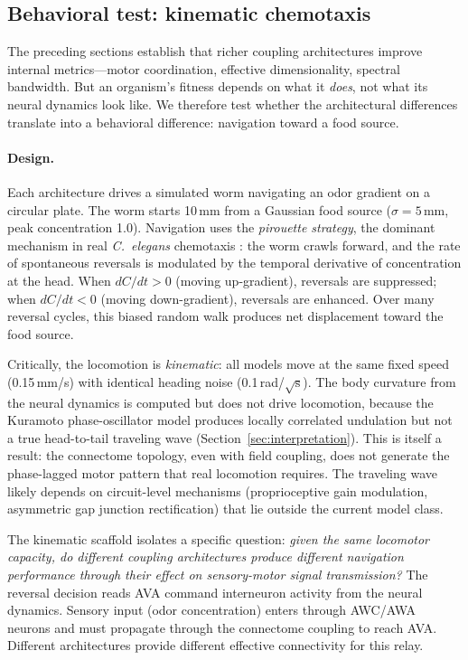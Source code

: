 \documentclass[12pt]{article}
\begin{document}
\subsection{Behavioral test: kinematic chemotaxis}
\label{sec:chemotaxis}

The preceding sections establish that richer coupling architectures improve internal metrics---motor coordination, effective dimensionality, spectral bandwidth. But an organism's fitness depends on what it \textit{does}, not what its neural dynamics look like. We therefore test whether the architectural differences translate into a behavioral difference: navigation toward a food source.

\paragraph{Design.} Each architecture drives a simulated worm navigating an odor gradient on a circular plate. The worm starts 10\,mm from a Gaussian food source ($\sigma = 5$\,mm, peak concentration 1.0). Navigation uses the \textit{pirouette strategy}, the dominant mechanism in real \textit{C.~elegans} chemotaxis \cite{pierce-shimomura1999}: the worm crawls forward, and the rate of spontaneous reversals is modulated by the temporal derivative of concentration at the head. When $dC/dt > 0$ (moving up-gradient), reversals are suppressed; when $dC/dt < 0$ (moving down-gradient), reversals are enhanced. Over many reversal cycles, this biased random walk produces net displacement toward the food source.

Critically, the locomotion is \textit{kinematic}: all models move at the same fixed speed (0.15\,mm/s) with identical heading noise (0.1\,rad/$\sqrt{\mathrm{s}}$). The body curvature from the neural dynamics is computed but does not drive locomotion, because the Kuramoto phase-oscillator model produces locally correlated undulation but not a true head-to-tail traveling wave (Section~\ref{sec:interpretation}). This is itself a result: the connectome topology, even with field coupling, does not generate the phase-lagged motor pattern that real locomotion requires. The traveling wave likely depends on circuit-level mechanisms (proprioceptive gain modulation, asymmetric gap junction rectification) that lie outside the current model class.

The kinematic scaffold isolates a specific question: \textit{given the same locomotor capacity, do different coupling architectures produce different navigation performance through their effect on sensory-motor signal transmission?} The reversal decision reads AVA command interneuron activity from the neural dynamics. Sensory input (odor concentration) enters through AWC/AWA neurons and must propagate through the connectome coupling to reach AVA. Different architectures provide different effective connectivity for this relay.
\end{document}
